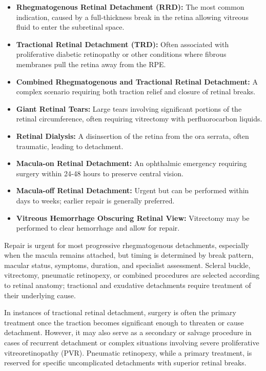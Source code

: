 \begin{itemize}
  \item \textbf{Rhegmatogenous Retinal Detachment (RRD):} The most common indication, caused by a full-thickness break in the retina allowing vitreous fluid to enter the subretinal space.
  \item \textbf{Tractional Retinal Detachment (TRD):} Often associated with proliferative diabetic retinopathy or other conditions where fibrous membranes pull the retina away from the RPE.
  \item \textbf{Combined Rhegmatogenous and Tractional Retinal Detachment:} A complex scenario requiring both traction relief and closure of retinal breaks.
  \item \textbf{Giant Retinal Tears:} Large tears involving significant portions of the retinal circumference, often requiring vitrectomy with perfluorocarbon liquids.
  \item \textbf{Retinal Dialysis:} A disinsertion of the retina from the ora serrata, often traumatic, leading to detachment.
  \item \textbf{Macula-on Retinal Detachment:} An ophthalmic emergency requiring surgery within 24-48 hours to preserve central vision.
  \item \textbf{Macula-off Retinal Detachment:} Urgent but can be performed within days to weeks; earlier repair is generally preferred.
  \item \textbf{Vitreous Hemorrhage Obscuring Retinal View:} Vitrectomy may be performed to clear hemorrhage and allow for repair.
\end{itemize}

Repair is urgent for most progressive rhegmatogenous detachments, especially when the macula remains attached, but timing is determined by break pattern, macular status, symptoms, duration, and specialist assessment. Scleral buckle, vitrectomy, pneumatic retinopexy, or combined procedures are selected according to retinal anatomy; tractional and exudative detachments require treatment of their underlying cause.

In instances of tractional retinal detachment, surgery is often the primary treatment once the traction becomes significant enough to threaten or cause detachment. However, it may also serve as a secondary or salvage procedure in cases of recurrent detachment or complex situations involving severe proliferative vitreoretinopathy (PVR). Pneumatic retinopexy, while a primary treatment, is reserved for specific uncomplicated detachments with superior retinal breaks.

